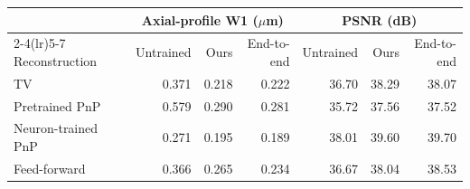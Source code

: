 \begin{tabular}{lrrrrrr}
\toprule
& \multicolumn{3}{c}{Axial-profile W1 ($\mu$m)} & \multicolumn{3}{c}{PSNR (dB)} \\
\cmidrule(lr){2-4}\cmidrule(lr){5-7}
Reconstruction & Untrained & Ours & End-to-end & Untrained & Ours & End-to-end \\
\midrule
TV & 0.371 & 0.218 & 0.222 & 36.70 & 38.29 & 38.07 \\
Pretrained PnP & 0.579 & 0.290 & 0.281 & 35.72 & 37.56 & 37.52 \\
Neuron-trained PnP & 0.271 & 0.195 & 0.189 & 38.01 & 39.60 & 39.70 \\
\midrule
Feed-forward & 0.366 & 0.265 & 0.234 & 36.67 & 38.04 & 38.53 \\
\bottomrule
\end{tabular}
